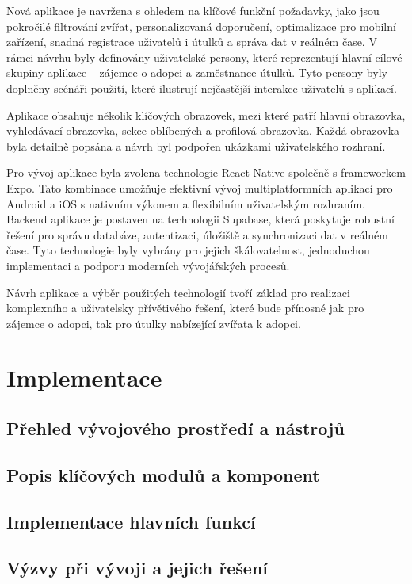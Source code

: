 \documentclass[12pt,a4paper]{report}
\begin{document}
Nová aplikace je navržena s ohledem na klíčové funkční požadavky, jako jsou pokročilé filtrování zvířat, personalizovaná doporučení, optimalizace pro mobilní zařízení, snadná registrace uživatelů i útulků a správa dat v reálném čase. V rámci návrhu byly definovány uživatelské persony, které reprezentují hlavní cílové skupiny aplikace – zájemce o adopci a zaměstnance útulků. Tyto persony byly doplněny scénáři použití, které ilustrují nejčastější interakce uživatelů s aplikací.

Aplikace obsahuje několik klíčových obrazovek, mezi které patří hlavní obrazovka, vyhledávací obrazovka, sekce oblíbených a profilová obrazovka. Každá obrazovka byla detailně popsána a návrh byl podpořen ukázkami uživatelského rozhraní.

Pro vývoj aplikace byla zvolena technologie React Native společně s frameworkem Expo. Tato kombinace umožňuje efektivní vývoj multiplatformních aplikací pro Android a iOS s nativním výkonem a flexibilním uživatelským rozhraním. Backend aplikace je postaven na technologii Supabase, která poskytuje robustní řešení pro správu databáze, autentizaci, úložiště a synchronizaci dat v reálném čase. Tyto technologie byly vybrány pro jejich škálovatelnost, jednoduchou implementaci a podporu moderních vývojářských procesů.

Návrh aplikace a výběr použitých technologií tvoří základ pro realizaci komplexního a uživatelsky přívětivého řešení, které bude přínosné jak pro zájemce o adopci, tak pro útulky nabízející zvířata k adopci.


\chapter{Implementace}
\section{Přehled vývojového prostředí a nástrojů}
\section{Popis klíčových modulů a komponent}
\section{Implementace hlavních funkcí}
\section{Výzvy při vývoji a jejich řešení}
\end{document}
